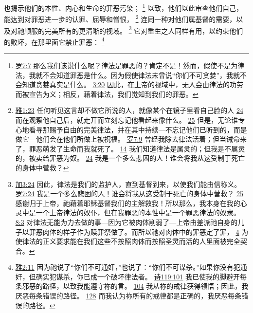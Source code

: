 \documentclass[12pt, a4paper, oneside]{ctexart}
\begin{document}
	也揭示他们的本性、内心和生命的罪恶污染；
	\footnote {
		\href{https://biblehub.com/romans/7-7.htm}{罗7:7} 那么我们该说什么呢？律法是罪恶的？肯定不是！然而，假使不是为律法，我就不会知道罪恶是什么。因为假使律法未曾说“你们不可贪婪”，我就不会知道贪婪真实是什么。
		\href{https://biblehub.com/romans/3-20.htm}{3:20} 因此，在上帝的视域中，无人会由律法的功劳而被宣告为义；相反，藉着律法，我们觉知到我们的罪恶。
	}
	以致，他们以此审查他们自己，能达到对罪恶进一步的认罪、屈辱和憎恨，
	\footnote {
		\href{https://biblehub.com/james/1-23.htm}{雅1:23} 任何听见这言却不做它所说的人，就像某个在镜子里看自己脸的人
		\href{https://biblehub.com/james/1-24.htm}{24} 而在观察他自己后，就走开而立刻忘记他看起来像什么。
		\href{https://biblehub.com/james/1-25.htm}{25} 但是，无论谁专心地看寻那赐予自由的完美律法，并在其中持续---不忘记他们已听到的，而是做它---他们会在他们所做上被祝福。
		\href{https://biblehub.com/romans/7-9.htm}{罗7:9} 曾经我除去律法活着；但当诫命来了，罪恶萌发了生命而我就死了。
		\href{https://biblehub.com/romans/7-14.htm}{14} 我们知道律法是属灵的；但我是不属灵的，被卖给罪恶为奴。
		\href{https://biblehub.com/romans/7-24.htm}{24} 我是一个多么悲困的人！谁会将我从这受制于死亡的身体中营救？
	}
	连同一种对他们属基督的需要，以及对祂顺服的完美所有的更清晰的视域。
	\footnote {
		\href{https://biblehub.com/galatians/3-24.htm}{加3:24} 因此，律法是我们的监护人，直到基督到来，以使我们能由信称义。
		\href{https://biblehub.com/romans/7-24.htm}{罗7:24} 我是一个多么悲困的人！谁会将我从这受制于死亡的身体中营救？
		\href{https://biblehub.com/romans/7-25.htm}{25} 感谢归于上帝，祂藉着耶稣基督我们的主解救我！所以那么，我本身在我的心灵中是一个上帝律法的奴仆，但在我罪恶的本性中是一个罪恶律法的奴隶。
		\href{https://biblehub.com/romans/8-3.htm}{8:3} 对律法无能为力去做的事---因为它被肉体削弱了---上帝由差派祂自身的儿子以罪恶肉体的样子作为赎罪祭做了。而所以祂对肉体中的罪恶定了罪，
		\href{https://biblehub.com/romans/8-4.htm}{4} 为使律法的正义要求能在我们这些不按照肉体而按照圣灵而活的人里面被完全契合。
	}
	它对重生之人同样有用，以约束他们的败坏，在那里面它禁止罪恶：
	\footnote {
		\href{https://biblehub.com/james/2-11.htm}{雅2:11} 因为祂说了“你们不可通奸，”也说了：“你们不可谋杀。”如果你没有犯通奸，但确实犯谋杀，你已成一个破坏律法者。
		\href{https://biblehub.com/psalms/119-101.htm}{诗119:101} 我已使我的脚避开每条邪恶的路径，以致我能遵守祢的言。
		\href{https://biblehub.com/psalms/119-104.htm}{104} 我从祢的戒律获得领悟；因此，我厌恶每条错误的路径。
		\href{https://biblehub.com/psalms/119-128.htm}{128} 而我认为祢所有的戒律都是正确的，我厌恶每条错误的路径。
	}
\end{document}
